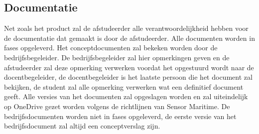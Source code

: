\subsection{Documentatie}
Net zoals het product zal de afstudeerder alle verantwoordelijkheid hebben voor de documentatie dat gemaakt is door de afstudeerder. Alle documenten worden in fases opgeleverd. Het conceptdocumenten zal bekeken worden door de bedrijfsbegeleider. De bedrijfsbegeleider zal hier opmerkingen geven en de afstudeerder zal deze opmerking verwerken voordat het opgestuurd wordt naar de docentbegeleider, de docentbegeleider is het laatste persoon die het document zal bekijken, de student zal alle opmerking verwerken wat een definitief document geeft. Alle versies van het documenten zal opgeslagen worden en zal uiteindelijk op OneDrive gezet worden volgens de richtlijnen van Sensor Maritime. De bedrijfsdocumenten worden niet in fases opgeleverd, de eerste versie van het bedrijfsdocument zal altijd een conceptverslag zijn.